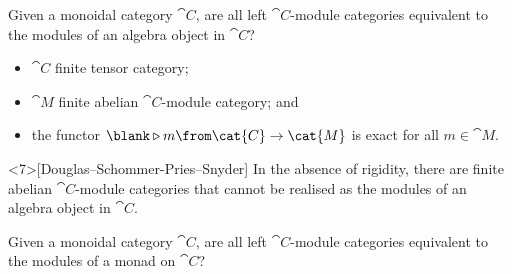 \documentclass[aspectratio=169,12pt,professionalfont]{beamer}
\begin{document}
\begin{frame}[standout]
  Given a monoidal category \(\cat{C}\),
  are all left \(\cat{C}\)-module categories
  equivalent to the modules of
  an algebra object in \(\cat{C}\)?
\end{frame}

\begin{frame}
  \begin{theorem}\label{finiterecon}
    \begin{itemize}[noitemsep]
      \item<1-> \(\cat{C}\) \alert<5>{finite} \alert<6>{tensor category};
      \item<2-> \(\cat{M}\) \alert<5>{finite} abelian \(\cat{C}\)\hyp{}module category; and
      \item<3-> the functor \(\blank \triangleright m \from \cat{C} \to \cat{M}\) is \alert<6>{exact} for all \(m \in \cat{M}\).
    \end{itemize}
  \end{theorem}
  \begin{proposition*}<7>[Douglas--Schommer-Pries--Snyder]
    In the absence of rigidity,
    there are finite abelian \(\cat{C}\)-module categories that cannot be realised as the modules of an algebra object in \(\cat{C}\).
  \end{proposition*}
\end{frame}

\begin{frame}[standout]
  Given a monoidal category \(\cat{C}\),
  are all left \(\cat{C}\)-module categories
  equivalent to the modules of
  a \alert{monad} on \(\cat{C}\)?\vphantom{algebraobject}
\end{frame}
\end{document}
